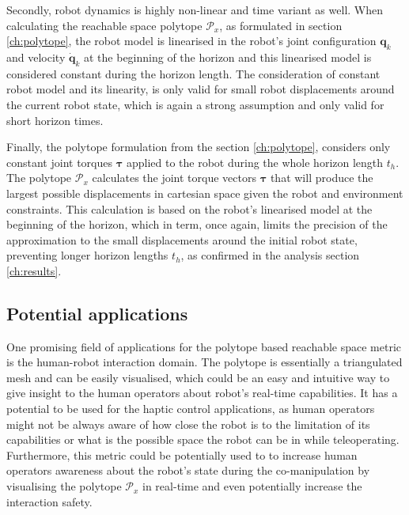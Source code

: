 Secondly, robot dynamics is highly non-linear and time variant as well. When calculating the reachable space polytope $\mathcal{P}_x$, as formulated in section \ref{ch:polytope}, the robot model is linearised in the robot's joint configuration $\bm{q}_k$ and velocity $\dot{\bm{q}}_k$  at the beginning of the horizon and this linearised model is considered constant during the horizon length. The consideration of constant robot model and its linearity, is only valid for small robot displacements around the current robot %
state, which is again a strong assumption and only valid for short horizon times. 

Finally, the polytope formulation from the section \ref{ch:polytope}, considers only constant joint torques $\bm{\tau}$ applied to the robot during the whole horizon length $t_h$. The polytope $\mathcal{P}_x$ calculates the joint torque vectors $\bm{\tau}$ that will produce the largest possible displacements in cartesian space given the robot and environment constraints. This calculation is based on the robot's linearised model at the beginning of the horizon, which in term, once again, limits the precision of the approximation to the small displacements around the initial robot state, preventing longer horizon lengths $t_h$, as confirmed in the analysis section \ref{ch:results}.

\vspace{-0.3cm}

\subsection{Potential applications}

One promising field of applications for the polytope based reachable space metric is the human-robot interaction domain. The polytope is essentially a triangulated mesh and can be easily visualised, which could be an easy and intuitive way to give insight to the human operators about robot's real-time capabilities. It has a potential to be used for the haptic control applications, as human operators might not be always aware of how close the robot is to the limitation of its capabilities or what is the possible space the robot can be in while teleoperating. Furthermore, this metric could be potentially used to to increase human operators awareness about the robot's state during the co-manipulation by visualising the polytope $\mathcal{P}_x$ in real-time and even potentially increase the interaction safety. 


